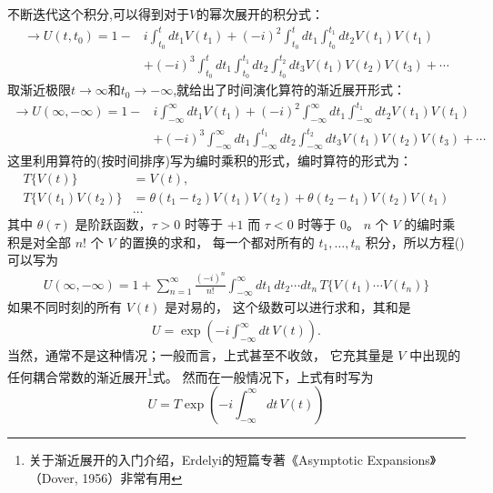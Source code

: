  不断迭代这个积分,可以得到对于$V$的幂次展开的积分式：
\[    \begin{aligned}
        \rightarrow U(t,t_0)=1-&i\int^{t}_{t_0}dt_1V(t_1)+(-i)^2\int^{t}_{t_0}dt_1\int_{t_0}^{t_1}dt_2V(t_1)V(t_1)\\
        &+(-i)^3\int^{t}_{t_0}dt_1\int^{t_1}_{t_0}dt_2\int^{t_2}_{t_0}dt_3V(t_1)V(t_2)V(t_3)+\cdots
    \end{aligned}\]
取渐近极限$t\rightarrow\infty$和$t_0\rightarrow-\infty$,就给出了时间演化算符的渐近展开形式：
\begin{equation}\label{dyson}
    \begin{aligned}
        \rightarrow U(\infty,-\infty)=1-&i\int^{\infty}_{-\infty}dt_1V(t_1)+(-i)^2\int^{\infty}_{-\infty}dt_1\int_{-\infty}^{t_1}dt_2V(t_1)V(t_1)\\
        &+(-i)^3\int^{\infty}_{-\infty}dt_1\int^{t_1}_{-\infty}dt_2\int^{t_2}_{-\infty}dt_3V(t_1)V(t_2)V(t_3)+\cdots
    \end{aligned}
\end{equation}
这里利用算符的(按时间排序)写为编时乘积的形式，编时算符的形式为：
\[
\begin{aligned}
T\{V(t)\} &= V(t), \\
T\{V(t_1)V(t_2)\} &= \theta(t_1-t_2)V(t_1)V(t_2)
+ \theta(t_2-t_1)V(t_2)V(t_1)\\
&\ldots
\end{aligned}
\]
其中 $\theta(\tau)$ 是阶跃函数，$\tau>0$ 时等于 $+1$ 而 $\tau<0$ 时等于 $0$。
$n$ 个 $V$ 的编时乘积是对全部 $n!$ 个 $V$ 的置换的求和，
每一个都对所有的 $t_1,\ldots,t_n$ 积分，所以方程()可以写为
\begin{equation*}
    \begin{aligned}
        U(\infty,-\infty)
        = 1 + \sum_{n=1}^{\infty} \frac{(-i)^n}{n!}
        \int_{-\infty}^{\infty} dt_1\,dt_2 \cdots dt_n\,
        T\{V(t_1)\cdots V(t_n)\}
\end{aligned}
\end{equation*}
如果不同时刻的所有 $V(t)$ 是对易的，
这个级数可以进行求和，其和是
\[
\begin{aligned}
U = \exp\!\left(-i\int_{-\infty}^{\infty} dt\,V(t)\right).
\end{aligned}
\]
当然，通常不是这种情况；一般而言，上式甚至不收敛，
它充其量是 $V$ 中出现的任何耦合常数的渐近展开\footnote{关于渐近展开的入门介绍，Erdelyi的短篇专著《Asymptotic Expansions》（Dover, 1956）非常有用}式。
然而在一般情况下，上式有时写为
\begin{equation}\label{dyson_ser}
        U = T \exp\!\left(-i\int_{-\infty}^{\infty} dt\,V(t)\right)   
\end{equation}
